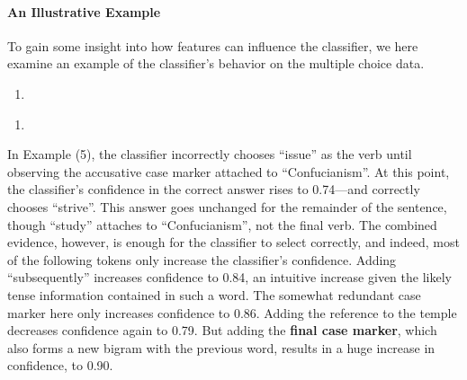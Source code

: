 \paragraph{An Illustrative Example}

To gain some insight into how features can influence the classifier,
we here examine an example of the classifier's behavior on the
multiple choice data.

\begin{enumerate}[(5)]
\listsep
\item \label{sent-class}
\end{enumerate}
\begin{enumerate}[(6)]
\listsep
\item \label{sent-class-choices}
\end{enumerate}
In Example (5), the classifier incorrectly chooses ``issue'' as the
verb until observing the accusative case marker attached to
``Confucianism''.  At this point, the classifier's confidence in the
correct answer rises to 0.74---and correctly chooses ``strive''.  This
answer goes unchanged for the remainder of the sentence, though
``study'' attaches to ``Confucianism'', not the final verb. The
combined evidence, however, is enough for the classifier to select
correctly, and indeed, most of the following tokens only increase the
classifier's confidence.  Adding ``subsequently'' increases confidence
to 0.84, an intuitive increase given the likely tense information
contained in such a word.  The somewhat redundant case marker here
only increases confidence to 0.86.  Adding the reference to the temple
decreases confidence again to 0.79.  But adding the \textbf{final case
  marker}, which also forms a new bigram with the previous word,
results in a huge increase in confidence, to 0.90.

